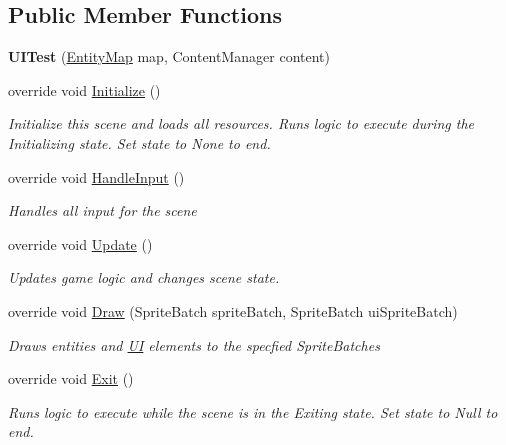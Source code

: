\subsection*{Public Member Functions}
\begin{DoxyCompactItemize}
\item 
\hypertarget{class_m_b2_d_1_1_testing_1_1_u_i_test_a992dea4865eafb48b8453b1cbd5f6da5}{}\label{class_m_b2_d_1_1_testing_1_1_u_i_test_a992dea4865eafb48b8453b1cbd5f6da5} 
{\bfseries U\+I\+Test} (\hyperlink{class_m_b2_d_1_1_entity_component_1_1_entity_map}{Entity\+Map} map, Content\+Manager content)
\item 
override void \hyperlink{class_m_b2_d_1_1_testing_1_1_u_i_test_af6f33faaa93d646edd5c74dfee6139d1}{Initialize} ()
\begin{DoxyCompactList}\small\item\em Initialize this scene and loads all resources. Runs logic to execute during the Initializing state. Set state to None to end. \end{DoxyCompactList}\item 
override void \hyperlink{class_m_b2_d_1_1_testing_1_1_u_i_test_abfdabac63f2f6dd07e49c181ce84b24d}{Handle\+Input} ()
\begin{DoxyCompactList}\small\item\em Handles all input for the scene \end{DoxyCompactList}\item 
override void \hyperlink{class_m_b2_d_1_1_testing_1_1_u_i_test_a547d5592fee47d4c9354ee8f307c8813}{Update} ()
\begin{DoxyCompactList}\small\item\em Updates game logic and changes scene state. \end{DoxyCompactList}\item 
override void \hyperlink{class_m_b2_d_1_1_testing_1_1_u_i_test_a9656d2d62517288a7b4387dafe741ea0}{Draw} (Sprite\+Batch sprite\+Batch, Sprite\+Batch ui\+Sprite\+Batch)
\begin{DoxyCompactList}\small\item\em Draws entities and \hyperlink{namespace_m_b2_d_1_1_u_i}{UI} elements to the specfied Sprite\+Batches \end{DoxyCompactList}\item 
override void \hyperlink{class_m_b2_d_1_1_testing_1_1_u_i_test_ad7ad379db3fc9990e634b3edbd4b1a41}{Exit} ()
\begin{DoxyCompactList}\small\item\em Runs logic to execute while the scene is in the Exiting state. Set state to Null to end. \end{DoxyCompactList}\item 

\end{DoxyCompactItemize}
